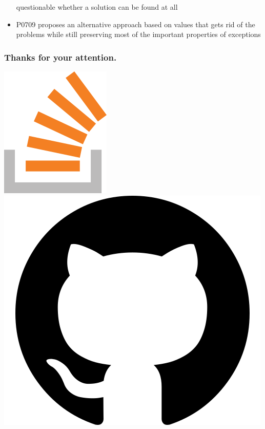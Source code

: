 \documentclass[aspectratio=169]{beamer}
\begin{document}
\begin{frame}
\begin{itemize}
questionable whether a solution can be found at all
  \item P0709 proposes an alternative approach based on values that gets rid of the problems while still preserving most of the important properties of exceptions
  \end{itemize}
\end{frame}

\begin{frame}
  \frametitle{Thanks for your attention.}

  \href{https://stackoverflow.com/users/577603/comicsansms}{\includegraphics[height=.05\textheight]{resources/so-icon.png}}
  \href{https://github.com/ComicSansMS}{\includegraphics[height=.05\textheight]{resources/github-icon.png}}

\end{frame}
\end{document}
